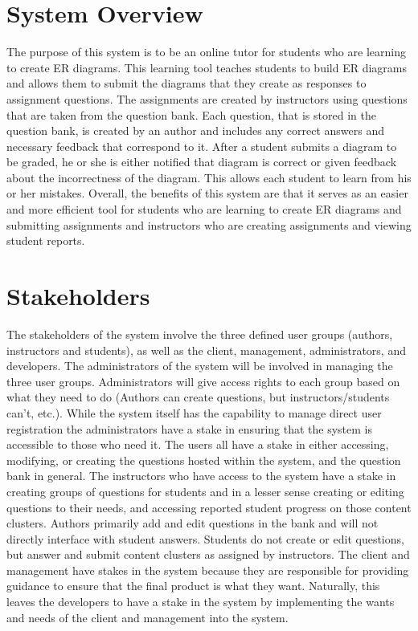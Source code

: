 \chapter {System Overview}

The purpose of this system is to be an online tutor for students who are learning to create ER diagrams. This learning tool teaches students to build ER diagrams and allows them to submit the diagrams that they create as responses to assignment questions. The assignments are created by instructors using questions that are taken from the question bank. Each question, that is stored in 
the question bank, is created by an author and includes any correct answers and necessary feedback that correspond to it. After a student submits a diagram to be graded, he or she is either notified that diagram is correct or given feedback about the incorrectness of the diagram. This allows each student to learn from his or her mistakes. Overall, the benefits of this system are that it serves as an easier and more efficient tool for students who are learning to create ER diagrams and submitting assignments and instructors who are creating assignments and viewing student reports.  

\chapter{Stakeholders}
The stakeholders of the system involve the three defined user groups (authors, instructors and students), as well as the client, management, administrators, and developers. The administrators of the system will be involved in managing the three user groups. Administrators will give access rights to each group based on what they need to do (Authors can create questions, but instructors/students can't, etc.). While the system itself has the capability to manage direct user registration the administrators have a stake in ensuring that the system is accessible to those who need it. The users all have a stake in either accessing, modifying, or creating the questions hosted within the system, and the question bank in general. The instructors who have access to the system have a stake in creating groups of questions for students and in a lesser sense creating or editing questions to their needs, and accessing reported student progress on those content clusters. Authors primarily add and edit questions in the bank and will not directly interface with student answers. Students do not create or edit questions, but answer and submit content clusters as assigned by instructors. The client and management have stakes in the system because they are responsible for providing guidance to ensure that the final product is what they want. Naturally, this leaves the developers to have a stake in the system by implementing the wants and needs of the client and management into the system.



